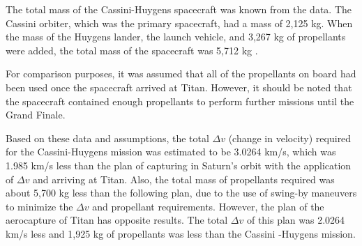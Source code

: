 \documentclass[conf]{new-aiaa}
\begin{document}
{\par The total mass of the Cassini-Huygens spacecraft was known from the data. The Cassini orbiter, which was the primary spacecraft, had a mass of 2,125 kg. When the mass of the Huygens lander, the launch vehicle, and 3,267 kg of propellants were added, the total mass of the spacecraft was 5,712 kg \cite{mahaffy_2004}.\\

\par For comparison purposes, it was assumed that all of the propellants on board had been used once the spacecraft arrived at Titan. However, it should be noted that the spacecraft contained enough propellants to perform further missions until the Grand Finale.\\
\par Based on these data and assumptions, the total $\Delta v$ (change in velocity) required for the Cassini-Huygens mission was estimated to be 3.0264 km/s, which was 1.985 km/s less than the plan of capturing in Saturn's orbit with the application of $\Delta v$ and arriving at Titan. Also, the total mass of propellants required was about 5,700 kg less than the following plan, due to the use of swing-by maneuvers to minimize the $\Delta v$ and propellant requirements. However, the plan of the aerocapture of Titan has opposite results. The total $\Delta v$ of this plan was 2.0264 km/s less and 1,925 kg of propellants was less than the Cassini -Huygens mission.




}
\end{document}

